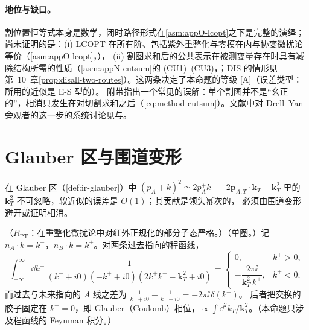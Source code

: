 \paragraph{地位与缺口。}割位置恒等式本身是数学，闭时路径形式在\cref{asm:appO-lcopt}之下是完整的演绎；尚未证明的是：(i) LCOPT 在所有阶、包括紫外重整化与零模在内与协变微扰论等价（\cref{asm:appO-lcopt}，\tagA），
(ii) 割图求和后的公共表示在被测变量存在时具有减除结构所需的性质（\cref{asm:appN-cutsum}的 (CU1)--(CU3)，\tagA；DIS 的情形见第~10~章\cref{prop:disall-two-routes}）。这两条决定了本命题的等级 [A]（误差类型：所用的近似是 E-S 型的）。
附带指出一个常见的误解：单个割图并不是“幺正的”，相消只发生在对切割求和之后（\cref{eq:method-cutsum}）。文献中对 Drell--Yan 旁观者的这一步的系统讨论见\cite{CollinsSoperSterman1988}与\cite[第~14.4~节]{Collins2011}。

\section{Glauber 区与围道变形}\label{sec:method-glauber}

在 Glauber 区（\cref{def:ir-glauber}）中 $(p_A+k)^2\simeq2p_A^+k^--2\mathbf p_{A,T}\cdot\mathbf k_T-\mathbf k_T^2$ 里的 $\mathbf k_T^2$ 不可忽略，软近似的误差是 $O(1)$；其贡献是领头幂次的，
必须由围道变形避开或证明相消。

\begin{proposition}\label{prop:method-glauber-oneloop}
（$R_{\mathrm{PT}}$：在重整化微扰论中对红外正规化的部分子态严格。）（单圈。）记 $n_A\cdot k=k^-$，$n_B\cdot k=k^+$。对两条过去指向的程函线，
\begin{equation}\label{eq:method-glauber-oneloop}
\int_{-\infty}^{\infty}\!\dd k^-\,\frac{1}{(k^-+i0)(-k^++i0)(2k^+k^--\mathbf k_T^2+i0)}=
\begin{cases}0,&k^+>0,\\[2pt]-\dfrac{2\pi\ii}{\mathbf k_T^2\,k^+},&k^+<0;\end{cases}
\end{equation}
而过去与未来指向的 $A$ 线之差为 $\frac1{k^-+i0}-\frac1{k^--i0}=-2\pi\ii\,\delta(k^-)$。
后者把交换的胶子固定在 $k^-=0$，即 Glauber（Coulomb）相位，$\propto\int\dd^2k_T/\mathbf k_T^2$。（本命题只涉及程函线的 Feynman 积分。）
\end{proposition}

